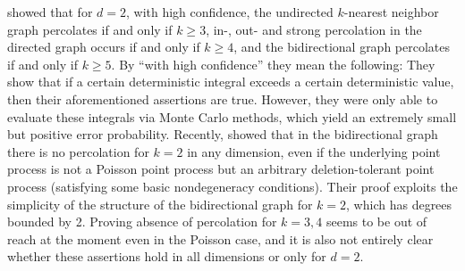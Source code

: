 \documentclass{article}
\theoremstyle{definition}
\newcommand{\1}{\mathbbm{1}}
\newcommand{\0}{\mathbf{o}}
\begin{document}

\cite{BalisterBollobas13} showed that for $d=2$, with high confidence, the undirected $k$-nearest neighbor graph percolates if and only if $k \geq 3$, in-, out- and strong percolation in the directed graph occurs if and only if $k\geq 4$, and the bidirectional graph percolates if and only if $k\geq 5$. By ``with high confidence'' they mean the following: They show that if a certain deterministic integral exceeds a certain deterministic value, then their aforementioned assertions are true. However, they were only able to evaluate these integrals via Monte Carlo methods, which yield an extremely small but positive error probability. Recently, \cite{JT22} showed that in the bidirectional graph there is no percolation for $k=2$ in any dimension, even if the underlying point process is not a Poisson point process but an arbitrary deletion-tolerant point process (satisfying some basic nondegeneracy conditions). Their proof exploits the simplicity of the structure of the bidirectional graph for $k=2$, which has degrees bounded by 2. Proving absence of percolation for $k=3,4$ seems to be out of reach at the moment even in the Poisson case, and it is also not entirely clear whether these assertions hold in all dimensions or only for $d=2$.
\end{document}
